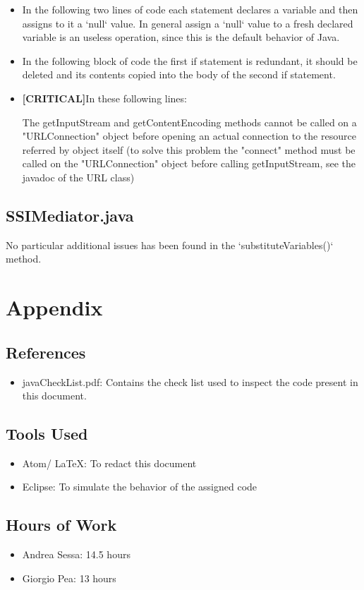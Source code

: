 \documentclass[11pt,titlepage]{article} %
\begin{document}
\begin{itemize}
\begin{itemize}
	     \item In the following two lines of code
	        each statement declares a variable and then assigns to it a `null` value. In general assign a `null` value to a fresh declared
		variable is an useless operation, since this is the default behavior of Java.
		

	     \item In the following block of code
	        the first if statement is redundant, it should be deleted and its contents copied into the body of the second if statement.
		

	     \item \textbf{[CRITICAL]}In these following lines:
		
		  The getInputStream and getContentEncoding methods cannot be called on a "URLConnection" object before opening an actual connection
		  to the resource referred by object itself (to solve this problem the "connect" method must be called on the
		  "URLConnection" object before calling getInputStream, see the javadoc of the URL class)
	    \end{itemize}
   \end{itemize}
  \subsection{SSIMediator.java}
    No particular additional issues has been found in the `substituteVariables()` method.

\newpage
\section{Appendix}
\subsection{References}
   \begin{itemize}
    \item javaCheckList.pdf: Contains the check list used to inspect the code present in this document.
   \end{itemize}
\subsection{Tools Used}
  \begin{itemize}
   \item Atom/ \LaTeX: To redact this document
   \item Eclipse: To simulate the behavior of the assigned code
  \end{itemize}
\subsection{Hours of Work}
  \begin{itemize}
   \item Andrea Sessa: 14.5 hours
   \item Giorgio Pea: 13 hours
  \end{itemize}
\end{document}

